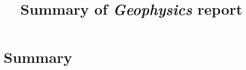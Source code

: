 \documentclass{article}
\begin{document}
\title{Summary of \emph{Geophysics} report}

\maketitle

\section{Summary}


\end{document}
